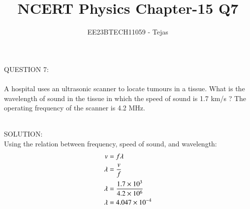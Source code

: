 \documentclass[journal,12pt,twocolumn]{IEEEtran}
\theoremstyle{remark}
\begin{document}

\vspace{3cm}

\title{NCERT Physics Chapter-15 Q7}
\author{EE23BTECH11059 - Tejas$^{}$%
}
\maketitle
\newpage

\Huge{QUESTION 7:} \\ \\
        \medskip
        \Large
A hospital uses an ultrasonic scanner to locate tumours in a tissue. What is the
wavelength of sound in the tissue in which the speed of sound is 1.7 km/s ? The operating frequency of the scanner is 4.2 MHz.

    \bigskip
    \Large
    \\
        \LARGE
        SOLUTION: \\
        \Large
        Using the relation between frequency, speed of sound, and wavelength:
         \\
          \begin{align}
           v &= f \lambda \\
\lambda &= \frac{v}{f} \notag \\
\lambda &= \frac{1.7 \times 10^3}{4.2 \times 10^6} \notag \\
\lambda &= 4.047 \times 10^{-4}
        \end{align}
        
        
        
             
             
        

        













\renewcommand{\thefigure}{\theenumi}
\renewcommand{\thetable}{\theenumi}
\end{document}
